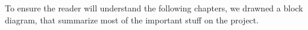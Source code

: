 To ensure the reader will understand the following chapters, we drawned a 
block diagram, that summarize most of the important stuff on the project.

